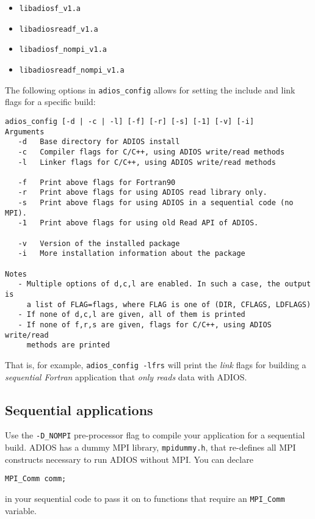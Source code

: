 \begin{itemize}
\item \verb+libadiosf_v1.a           +   
\item \verb+libadiosreadf_v1.a       +   
\item \verb+libadiosf_nompi_v1.a     +   
\item \verb+libadiosreadf_nompi_v1.a +   
\end{itemize}

The following options in \verb+adios_config+ allows for setting the include and link flags for a specific build:

\begin{lstlisting}
adios_config [-d | -c | -l] [-f] [-r] [-s] [-1] [-v] [-i]
Arguments
   -d   Base directory for ADIOS install
   -c   Compiler flags for C/C++, using ADIOS write/read methods
   -l   Linker flags for C/C++, using ADIOS write/read methods

   -f   Print above flags for Fortran90
   -r   Print above flags for using ADIOS read library only.
   -s   Print above flags for using ADIOS in a sequential code (no MPI). 
   -1   Print above flags for using old Read API of ADIOS.

   -v   Version of the installed package
   -i   More installation information about the package

Notes
   - Multiple options of d,c,l are enabled. In such a case, the output is
     a list of FLAG=flags, where FLAG is one of (DIR, CFLAGS, LDFLAGS)
   - If none of d,c,l are given, all of them is printed
   - If none of f,r,s are given, flags for C/C++, using ADIOS write/read 
     methods are printed
\end{lstlisting}

That is, for example, \verb+adios_config -lfrs+ will print the \emph{link} flags for building 
a \emph{sequential Fortran} application that \emph{only reads} data with ADIOS. 

\subsection{Sequential applications}

Use the \verb+-D_NOMPI+ pre-processor flag to compile your application 
for a sequential build. ADIOS has a dummy MPI library, \verb+mpidummy.h+, that re-defines 
all MPI constructs necessary to run ADIOS without MPI. You can declare

\verb+MPI_Comm comm;+

in your sequential code to pass it on to functions that require an \verb+MPI_Comm+ variable.

